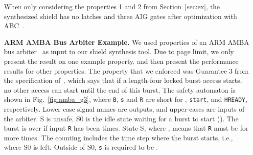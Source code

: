 \documentclass{llncs}
\begin{document}
When only considering the properties 1 and 2 from Section~\ref{sec:ex}, 
the synthesized shield has no latches and three AIG gates after 
optimization with ABC~\cite{BraytonM10}.

\noindent
\textbf{ARM AMBA Bus Arbiter Example.}
We used properties of an ARM AMBA bus arbiter~\cite{BloemJPPS12} as 
input to our shield synthesis tool.  Due to page limit, we only present 
the result on one example property, and then present the performance 
results for other properties. 
The property that we enforced was Guarantee 3 from the specification 
of~\cite{BloemJPPS12}, which says that if a length-four locked burst 
access starts, no other access can start until the end of this burst. 
The safety automaton is shown in Fig.~\ref{fig:amba_g3}, where 
\texttt{B}, \texttt{s} and \texttt{R} are short for , \texttt{start}, and \texttt{HREADY}, 
respectively.  Lower case signal names are outputs, and upper-cases are 
inputs of the arbiter.  S is unsafe. S0 is the idle state waiting 
for a burst to start (). The burst is over 
if input \texttt{R} has been   times.  State S, where 
, means that \texttt{R} must be  for  more times.  
The counting includes the time step where the burst starts, i.e., where 
S0 is left.  Outside of S0, \texttt{s} is required to be .
\end{document}
